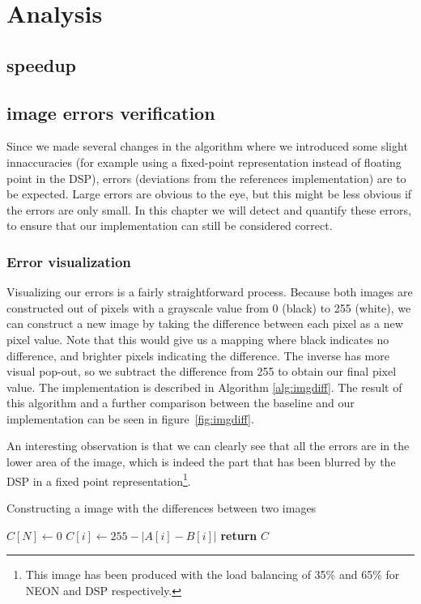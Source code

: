 \section{Analysis}
\subsection{speedup}
\subsection{image errors verification}
Since we made several changes in the algorithm where we introduced some slight innaccuracies (for example using a fixed-point representation instead of floating point in the DSP), errors (deviations from the references implementation) are to be expected. Large errors are obvious to the eye, but this might be less obvious if the errors are only small. In this chapter we will detect and quantify these errors, to ensure that our implementation can still be considered correct.

\subsubsection{Error visualization}
Visualizing our errors is a fairly straightforward process. Because both images are constructed out of pixels with a grayscale value from 0 (black) to 255 (white), we can construct a new image by taking the difference between each pixel as a new pixel value. Note that this would give us a mapping where black indicates no difference, and brighter pixels indicating the difference. The inverse has more visual pop-out, so we subtract the difference from 255 to obtain our final pixel value. The implementation is described in Algorithm \ref{alg:imgdiff}. The result of this algorithm and a further comparison between the baseline and our implementation can be seen in figure~\ref{fig:imgdiff}.

An interesting observation is that we can clearly see that all the errors are in the lower area of the image, which is indeed the part that has been blurred by the DSP in a fixed point representation\footnote{This image has been produced with the load balancing of 35\% and 65\% for NEON and DSP respectively.}.

\begin{algorithm}[t]
    \caption{Constructing a image with the differences between two images}\label{alg:imgdiff}
    \begin{algorithmic}[1]
          
        \State $C[N]\gets 0$
           \State $C[i]\gets 255 - |A[i] - B[i]|$   
        \EndFor
        \State \textbf{return} $C$
        \EndProcedure
    \end{algorithmic}
\end{algorithm}

